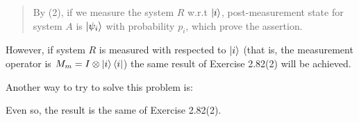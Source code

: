 \begin{enumerate}
\begin{quotation}
        By (2), if we measure the system $R$ w.r.t $\ket{i}$, post-measurement state for system $A$ is $\ket{\psi_i}$ with probability $p_i$, which prove the assertion.
    \end{quotation}
    
    However, if system $R$ is measured with respected to $\ket{i}$
    (that is, the measurement operator is $M_m = I \otimes \ket{i}\bra{i}$)
    the same result of Exercise 2.82(2) will be achieved.
    
    Another way to try to solve this problem is:
    
    Even so, the result is the same of Exercise 2.82(2).
\end{enumerate}